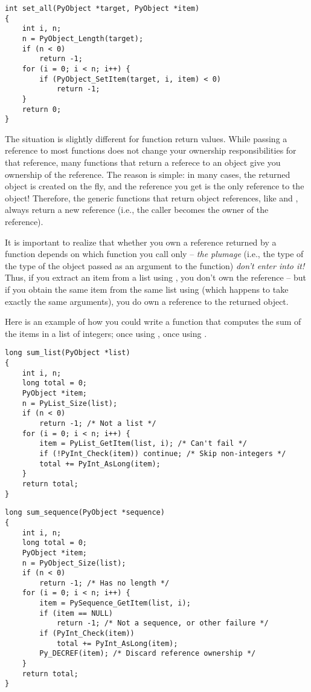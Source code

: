 \documentclass[twoside]{report}
\begin{document}
\begin{verbatim}
int set_all(PyObject *target, PyObject *item)
{
    int i, n;
    n = PyObject_Length(target);
    if (n < 0)
        return -1;
    for (i = 0; i < n; i++) {
        if (PyObject_SetItem(target, i, item) < 0)
            return -1;
    }
    return 0;
}
\end{verbatim}

The situation is slightly different for function return values.  
While passing a reference to most functions does not change your 
ownership responsibilities for that reference, many functions that 
return a referece to an object give you ownership of the reference.
The reason is simple: in many cases, the returned object is created 
on the fly, and the reference you get is the only reference to the 
object!  Therefore, the generic functions that return object 
references, like  and 
, always return a new reference (i.e., the 
caller becomes the owner of the reference).

It is important to realize that whether you own a reference returned 
by a function depends on which function you call only -- \emph{the 
plumage} (i.e., the type of the type of the object passed as an 
argument to the function) \emph{don't enter into it!}  Thus, if you 
extract an item from a list using , you don't 
own the reference -- but if you obtain the same item from the same 
list using  (which happens to take exactly 
the same arguments), you do own a reference to the returned object.

Here is an example of how you could write a function that computes the 
sum of the items in a list of integers; once using 
, once using .

\begin{verbatim}
long sum_list(PyObject *list)
{
    int i, n;
    long total = 0;
    PyObject *item;
    n = PyList_Size(list);
    if (n < 0)
        return -1; /* Not a list */
    for (i = 0; i < n; i++) {
        item = PyList_GetItem(list, i); /* Can't fail */
        if (!PyInt_Check(item)) continue; /* Skip non-integers */
        total += PyInt_AsLong(item);
    }
    return total;
}
\end{verbatim}

\begin{verbatim}
long sum_sequence(PyObject *sequence)
{
    int i, n;
    long total = 0;
    PyObject *item;
    n = PyObject_Size(list);
    if (n < 0)
        return -1; /* Has no length */
    for (i = 0; i < n; i++) {
        item = PySequence_GetItem(list, i);
        if (item == NULL)
            return -1; /* Not a sequence, or other failure */
        if (PyInt_Check(item))
            total += PyInt_AsLong(item);
        Py_DECREF(item); /* Discard reference ownership */
    }
    return total;
}
\end{verbatim}
\end{document}
